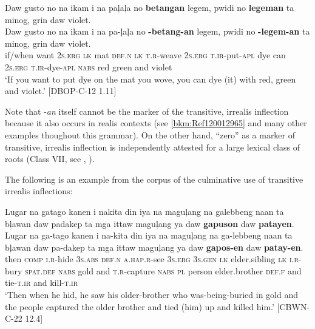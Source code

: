 \ea
\label{bkm:Ref499555402}
Daw  gusto  no  na  ikam  i  na  paļaļa  no  \textbf{betangan} legem,  pwidi  no  \textbf{legeman}  ta  minog,  grin  daw  violet. \\\smallskip
 \gll Daw  gusto  no  na  ikam  i  na  pa-ļaļa  no  \emptyset{}\textbf{-betang-an} legem,\footnotemark{}  pwidi  no  \emptyset{}\textbf{-legem-an}  ta  minog,  grin  daw  violet. \\
if/when  want  2\textsc{s.erg}  \textsc{lk}  mat  \textsc{def.n}  \textsc{lk}  \textsc{t.r}-weave  2\textsc{s.erg}  \textsc{t.ir}-put-\textsc{apl}
dye  can  2\textsc{s.erg}  \textsc{t.ir}-dye-\textsc{apl}  \textsc{nabs}  red  green  and  violet \\
\glt `If you want to put dye on the mat you wove, you can dye (it) with red, green and violet.’ [DBOP-C-12 1.11]
\z

Note that -\textit{an} itself cannot be the marker of the transitive, irrealis inflection because it also occurs in realis contexts (see \ref{bkm:Ref120012965} and many other examples thoughout this grammar). On the other hand, “zero” as a marker of transitive, irrealis inflection is independently attested for a large lexical class of roots (Class VII, see , ). 

The following is an example from the corpus of the culminative use of transitive irrealis inflections:

\ea
Lugar  na  gatago  kanen  i  nakita  din  iya  na  maguļang  na  galebbeng  naan  ta  bļawan  daw  padakep  ta mga  ittaw maguļang  ya  daw  \textbf{gapuson}  daw  \textbf{patayen}. \\\smallskip
 \gll Lugar  na  ga-tago  kanen  i  na-kita  din  iya  na  maguļang  na  ga-lebbeng  naan  ta  bļawan  daw  pa-dakep  ta mga  ittaw maguļang  ya  daw  \textbf{gapos-en}  daw  \textbf{patay-en}. \\
then  \textsc{comp}  \textsc{i.r}-hide  3\textsc{s.abs}  \textsc{def.n}  \textsc{a.hap.r}-see  3\textsc{s.erg} 3\textsc{s.gen}  \textsc{lk} elder.sibling
\textsc{lk}  \textsc{i.r}{}-bury  \textsc{spat.def}  \textsc{nabs}  gold  and  \textsc{t.r}-capture  \textsc{nabs} \textsc{pl} person elder.brother  \textsc{def.f} and  tie-\textsc{t.ir} and  kill-\textsc{t.ir} \\
\glt `Then when he hid, he saw his older-brother who was-being-buried in gold and the people captured the older brother and tied (him) up and killed him.’ [CBWN-C-22 12.4]
\z

